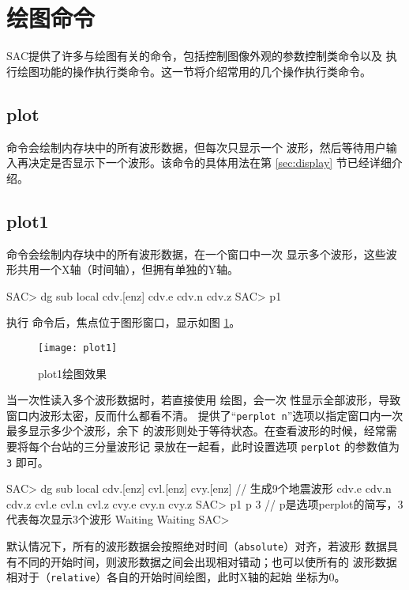 \section{绘图命令}
SAC提供了许多与绘图有关的命令，包括控制图像外观的参数控制类命令以及
执行绘图功能的操作执行类命令。这一节将介绍常用的几个操作执行类命令。

\subsection{plot}
 命令会绘制内存块中的所有波形数据，但每次只显示一个
波形，然后等待用户输入再决定是否显示下一个波形。该命令的具体用法在第
\ref{sec:display} 节已经详细介绍。

\subsection{plot1}
 命令会绘制内存块中的所有波形数据，在一个窗口中一次
显示多个波形，这些波形共用一个X轴（时间轴），但拥有单独的Y轴。

\begin{SACCode}
SAC> dg sub local cdv.[enz]
cdv.e cdv.n cdv.z
SAC> p1
\end{SACCode}

执行  命令后，焦点位于图形窗口，显示如图 \ref{fig:plot1}。
\begin{figure}[H]
\centering
\texttt{[image: plot1]}
\caption{plot1绘图效果}
\label{fig:plot1}
\end{figure}

当一次性读入多个波形数据时，若直接使用  绘图，会一次
性显示全部波形，导致窗口内波形太密，反而什么都看不清。
提供了``\texttt{perplot n}''选项以指定窗口内一次最多显示多少个波形，余下
的波形则处于等待状态。在查看波形的时候，经常需要将每个台站的三分量波形记
录放在一起看，此时设置选项 \texttt{perplot} 的参数值为 \texttt{3} 即可。
\begin{SACCode}
SAC> dg sub local cdv.[enz] cvl.[enz] cvy.[enz]  // 生成9个地震波形
cdv.e cdv.n cdv.z cvl.e cvl.n cvl.z cvy.e cvy.n cvy.z
SAC> p1 p 3         // p是选项perplot的简写，3代表每次显示3个波形
Waiting
Waiting
SAC>
\end{SACCode}

默认情况下，所有的波形数据会按照绝对时间（\texttt{absolute}）对齐，若波形
数据具有不同的开始时间，则波形数据之间会出现相对错动；也可以使所有的
波形数据相对于（\texttt{relative}）各自的开始时间绘图，此时X轴的起始
坐标为0。

